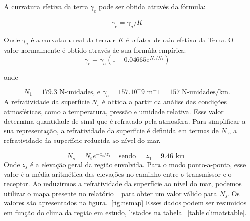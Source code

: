 \begin{table}[h]
\caption[Valores para a permissividade relativa e condutividade do solo.]
{Valores para a permissividade relativa e condutividade do solo.}
\label{table:sigmainterval}
\centering
{}
\end{table}

A curvatura efetiva da terra $\gamma_e$ pode ser obtida através da fórmula:

\[
\gamma_e = \gamma_a/K
\]

Onde $\gamma_a$ é a curvatura real da terra e $K$ é o fator de raio efetivo da Terra. O valor normalmente é obtido através de sua formúla empírica:
\[
\gamma_e = \gamma_a(1-0.04665e^{N_s/N_1})
\]

onde

\[
N_1 = 179.3 \text{ N-unidades, e } \gamma_a = 157 . 10^-9 \text{ m} ^-1 = 157 \text{ N-unidades/km.}
\]
A refratividade da superfície \begin{math}N_s\end{math} é obtida a partir da análise das condições atmosféricas, como a temperatura, pressão e umidade relativa. Esse valor determina quantidade de sinal que é refratado pela atmosfera.
Para simplificar a sua representação, a refratividade da superfície  é definida em termos de \begin{math}N_0\end{math}, a refratividade da superfície reduzida ao nível do mar.

\[
N_s = N_0e^{-z_s/z_1} \,\,\,\,\, \text{ sendo} \,\,\,\,\,\,\,\,\, z_1 = 9.46 \text{ km }
\]
Onde \begin{math}z_s\end{math} é a elevação geral da região envolvida. Para o modo ponto-a-ponto, esse valor é a média aritmética das elevações no caminho entre o transmissor e o receptor.
Ao reduzirmos a refratividade da superfície ao nível do mar, podemos utilizar o mapa presente no relatório ~\cite{longleyricedelta} para obter um valor válido para \begin{math}N_s\end{math}. Os valores são apresentados na figura.~\ref{fig:nsmap} Esses dados podem ser resumidos em função do clima da região em estudo, listados na tabela ~\ref{table:climatetable}.



